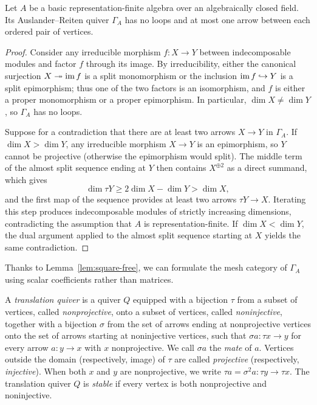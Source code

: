 \begin{lemma}
\label{lem:square-free}
Let $A$ be a basic representation-finite algebra over an algebraically
closed field. Its Auslander--Reiten quiver $\Gamma_A$ has no loops and at
most one arrow between each ordered pair of vertices.
\end{lemma}
\begin{proof}
Consider any irreducible morphism $f:X\to Y$ between indecomposable modules
and factor $f$ through its image. By irreducibility, either the canonical
surjection $X\twoheadrightarrow\operatorname{im} f$ is a split monomorphism or the
inclusion $\operatorname{im} f\hookrightarrow Y$ is a split epimorphism; thus one of the
two factors is an isomorphism, and $f$ is either a proper monomorphism or a
proper epimorphism. In particular, $\dim X\ne\dim Y$, so $\Gamma_A$ has no
loops.

Suppose for a contradiction that there are at least two arrows $X\to Y$ in
$\Gamma_A$. If $\dim X>\dim Y$, any irreducible morphism $X\to Y$ is an
epimorphism, so $Y$ cannot be projective (otherwise the epimorphism would
split). The middle term of the almost split sequence ending at $Y$ then
contains $X^{\oplus 2}$ as a direct summand, which gives
\[
 \dim\tau Y\geq2\dim X-\dim Y>\dim X,
\]
and the first map of the sequence provides at least two arrows
$\tau Y\to X$. Iterating this step produces indecomposable modules of
strictly increasing dimensions, contradicting the assumption that $A$ is
representation-finite. If $\dim X<\dim Y$, the dual argument applied to the
almost split sequence starting at $X$ yields the same contradiction.
\end{proof}

Thanks to Lemma~\ref{lem:square-free}, we can formulate the mesh category of
$\Gamma_A$ using scalar coefficients rather than matrices.

\begin{definition}
\label{def:translation-quiver}
A \emph{translation quiver} is a quiver $Q$ equipped with a bijection $\tau$
from a subset of vertices, called \emph{nonprojective}, onto a subset of
vertices, called \emph{noninjective}, together with a bijection $\sigma$
from the set of arrows ending at nonprojective vertices onto the set of
arrows starting at noninjective vertices, such that $\sigma a:\tau x\to y$
for every arrow $a:y\to x$ with $x$ nonprojective. We call $\sigma a$ the
\emph{mate} of $a$. Vertices outside the domain (respectively, image) of
$\tau$ are called \emph{projective} (respectively, \emph{injective}). When
both $x$ and $y$ are nonprojective, we write
$\tau a=\sigma^2a:\tau y\to\tau x$. The translation quiver $Q$ is
\emph{stable} if every vertex is both nonprojective and noninjective.
\end{definition}

